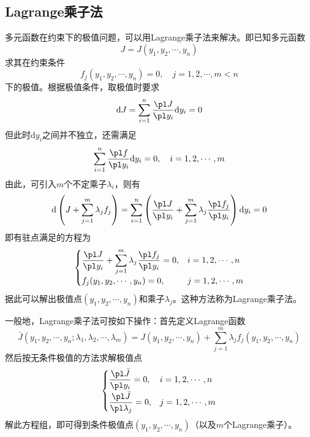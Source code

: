 \subsection{Lagrange乘子法}

多元函数在约束下的极值问题，可以用{\heiti Lagrange乘子法}来解决。即已知多元函数
\begin{equation*}
	J = J(y_1,y_2,\cdots,y_n)
\end{equation*}
求其在约束条件
\begin{equation*}
	f_j(y_1,y_2,\cdots,y_n) = 0,\quad j = 1,2,\cdots,m<n
\end{equation*}
下的极值。根据极值条件，取极值时要求
\begin{equation}
	\mathrm{d} J = \sum_{i=1}^n \frac{\pl J}{\pl y_i} \mathrm{d}y_i = 0
\end{equation}
但此时$\mathrm{d} y_i$之间并不独立，还需满足
\begin{equation}
	\sum_{i=1}^n \frac{\pl f}{\pl y_i} \mathrm{d} y_i = 0,\quad i=1,2,\cdots,m
\end{equation}
由此，可引入$m$个不定乘子$\lambda_i$，则有
\begin{equation}
	\mathrm{d} \left(J + \sum_{j=1}^m \lambda_j f_j\right) = \sum_{i=1}^n \left(\frac{\pl J}{\pl y_i} + \sum_{j=1}^m \lambda_j \frac{\pl f_j}{\pl y_i} \right) \mathrm{d} y_i = 0
\end{equation}
即有驻点满足的方程为
\begin{equation}
	\begin{cases}
		\displaystyle \frac{\pl J}{\pl y_i} + \sum_{j=1}^m \lambda_j \frac{\pl f_j}{\pl y_i} = 0, & i=1,2,\cdots,n \\
		f_j(y_1,y_2,\cdots,y_n) = 0, & j=1,2,\cdots,m
	\end{cases}
\end{equation}
据此可以解出极值点$(y_1,y_2,\cdots,y_n)$和乘子$\lambda_j$。这种方法称为Lagrange乘子法。

一般地，Lagrange乘子法可按如下操作：首先定义Lagrange函数
\begin{equation}
	\bar{J}(y_1,y_2,\cdots,y_n;\lambda_1,\lambda_2,\cdots,\lambda_m) = J(y_1,y_2,\cdots,y_n) + \sum_{j=1}^m \lambda_j f_j(y_1,y_2,\cdots,y_n)
\end{equation}
然后按无条件极值的方法求解极值点
\begin{equation}
	\begin{cases}
		\displaystyle \frac{\pl \bar{J}}{\pl y_i} = 0, & i=1,2,\cdots,n \\[1.5ex]
		\displaystyle \frac{\pl \bar{J}}{\pl \lambda_j} = 0, & j = 1,2,\cdots,m
	\end{cases}
\end{equation}
解此方程组，即可得到条件极值点$(y_1,y_2,\cdots,y_n)$（以及$m$个Lagrange乘子）。

